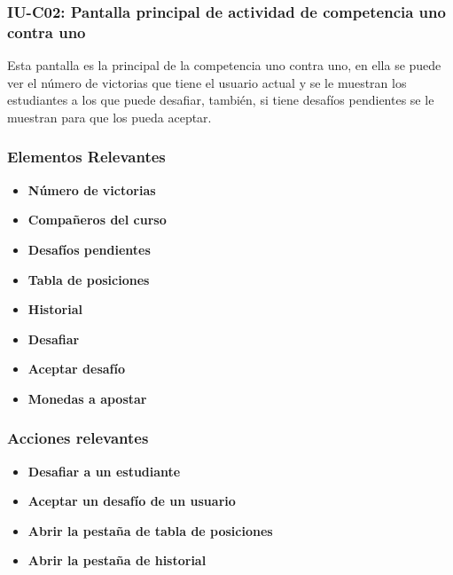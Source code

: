 
\subsubsection{IU-C02: Pantalla principal de actividad de competencia uno contra uno}

Esta pantalla es la principal de la competencia uno contra uno, en ella se puede ver el número de victorias que tiene el usuario actual y se le muestran los estudiantes a los que puede desafiar, también, si tiene desafíos pendientes se le muestran para que los pueda aceptar.


\subsubsection{Elementos Relevantes}

    \begin{itemize}
    \item {\bf Número de victorias}
    \item {\bf Compañeros del curso}
    \item {\bf Desafíos pendientes}
    \item {\bf Tabla de posiciones}
    \item {\bf Historial}
    \item {\bf Desafiar}
    \item {\bf Aceptar desafío}
    \item {\bf Monedas a apostar}
    \end{itemize}

\subsubsection{Acciones relevantes}

    \begin{itemize}
    \item {\bf Desafiar a un estudiante}
    \item {\bf Aceptar un desafío de un usuario}
    \item {\bf Abrir la pestaña de tabla de posiciones}
    \item {\bf Abrir la pestaña de historial}
    \end{itemize}

\clearpage
